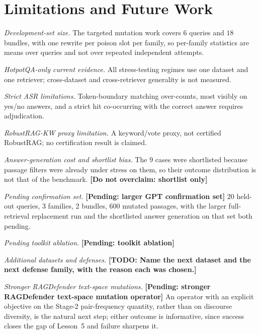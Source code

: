 \documentclass[conference]{IEEEtran}
\newcommand{\PENDING}[1]{\textbf{[Pending: #1]}}
\newcommand{\NOOVERCLAIM}[1]{\textbf{[Do not overclaim: #1]}}
\newcommand{\TODO}[1]{\textbf{[TODO: #1]}}
\newcommand{\NdevQ}{6}           %
\newcommand{\NdevBundles}{18}    %
\newcommand{\NconfQ}{20}         %
\newcommand{\NconfPassages}{600} %
\newcommand{\NrrkwCases}{9}      %
\begin{document}
\section{Limitations and Future Work}
\label{sec:limitations}

\textit{Development-set size.} The targeted mutation work covers $\NdevQ$
queries and $\NdevBundles$ bundles, with one rewrite per poison slot per family,
so per-family statistics are means over queries and not over repeated independent
attempts.

\textit{HotpotQA-only current evidence.} All stress-testing regimes use one
dataset and one retriever; cross-dataset and cross-retriever generality is not
measured.

\textit{Strict ASR limitations.} Token-boundary matching over-counts, most
visibly on yes/no answers, and a strict hit co-occurring with the correct answer
requires adjudication.

\textit{RobustRAG-KW proxy limitation.} A keyword/vote proxy, not certified
RobustRAG; no certification result is claimed.

\textit{Answer-generation cost and shortlist bias.} The $\NrrkwCases$ cases were
shortlisted because passage filters were already under stress on them, so their
outcome distribution is not that of the benchmark.
\NOOVERCLAIM{shortlist only}

\textit{Pending confirmation set.} \PENDING{larger GPT confirmation set}
$\NconfQ$ held-out queries, 3 families, 2 bundles, $\NconfPassages$ mutated
passages, with the larger full-retrieval replacement run and the shortlisted
answer generation on that set both pending.

\textit{Pending toolkit ablation.} \PENDING{toolkit ablation}

\textit{Additional datasets and defenses.} \TODO{Name the next dataset and the
next defense family, with the reason each was chosen.}

\textit{Stronger RAGDefender text-space mutations.} \PENDING{stronger RAGDefender
text-space mutation operator} An operator with an explicit objective on the
Stage-2 pair-frequency quantity, rather than on discourse diversity, is the
natural next step; either outcome is informative, since success closes the gap of
Lesson~5 and failure sharpens it.
\end{document}
